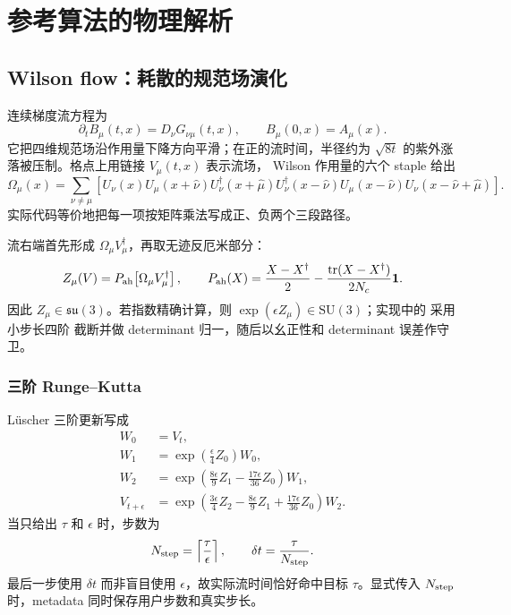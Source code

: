 \documentclass[UTF8,a4paper,11pt]{ctexart}
\newcommand{\code}[1]{\texttt{\detokenize{#1}}}
\newcommand{\tr}{\operatorname{tr}}
\newcommand{\SU}{\mathrm{SU}}
\begin{document}
\section{参考算法的物理解析}

\subsection{Wilson flow：耗散的规范场演化}

连续梯度流方程为
\begin{equation}
 \partial_t B_\mu(t,x)=D_\nu G_{\nu\mu}(t,x),
 \qquad B_\mu(0,x)=A_\mu(x).
\label{eq:continuum-flow}
\end{equation}
它把四维规范场沿作用量下降方向平滑；在正的流时间，半径约为
$\sqrt{8t}$ 的紫外涨落被压制。格点上用链接 $V_\mu(t,x)$ 表示流场，
Wilson 作用量的六个 staple 给出
\begin{equation}
 \Omega_\mu(x)=\sum_{\nu\ne\mu}
 \left[
 U_\nu(x)U_\mu(x+\hat\nu)U_\nu^\dagger(x+\hat\mu)
 U_\nu^\dagger(x-\hat\nu)U_\mu(x-\hat\nu)
 U_\nu(x-\hat\nu+\hat\mu)
 \right].
\label{eq:staple}
\end{equation}
实际代码等价地把每一项按矩阵乘法写成正、负两个三段路径。

流右端首先形成 $\Omega_\mu V_\mu^\dagger$，再取无迹反厄米部分：
\begin{equation}
 Z_\mu(V)=P_{\rm ah}\!\left[\Omega_\mu V_\mu^\dagger\right],
\qquad
 P_{\rm ah}(X)
 =\frac{X-X^\dagger}{2}
 -\frac{\tr(X-X^\dagger)}{2N_c}\mathbf 1.
\label{eq:flow-generator}
\end{equation}
因此 $Z_\mu\in\mathfrak{su}(3)$。若指数精确计算，则
$\exp(\epsilon Z_\mu)\in\SU(3)$；实现中的 \code{su3\_exp} 采用小步长四阶
截断并做 determinant 归一，随后以幺正性和 determinant 误差作守卫。

\subsubsection{三阶 Runge--Kutta}

Lüscher 三阶更新写成
\begin{align}
 W_0&=V_t,\\
 W_1&=\exp\left(\frac{\epsilon}{4}Z_0\right)W_0,\\
 W_2&=\exp\left(\frac{8\epsilon}{9}Z_1
              -\frac{17\epsilon}{36}Z_0\right)W_1,\\
 V_{t+\epsilon}
 &=\exp\left(\frac{3\epsilon}{4}Z_2
              -\frac{8\epsilon}{9}Z_1
              +\frac{17\epsilon}{36}Z_0\right)W_2.
\label{eq:rk3}
\end{align}
当只给出 $\tau$ 和 $\epsilon$ 时，步数为
\begin{equation}
 N_{\rm step}=\left\lceil\frac{\tau}{\epsilon}\right\rceil,
\qquad \delta t=\frac{\tau}{N_{\rm step}}.
\label{eq:flow-steps}
\end{equation}
最后一步使用 $\delta t$ 而非盲目使用 $\epsilon$，故实际流时间恰好命中目标
$\tau$。显式传入 $N_{\rm step}$ 时，metadata 同时保存用户步数和真实步长。
\end{document}
